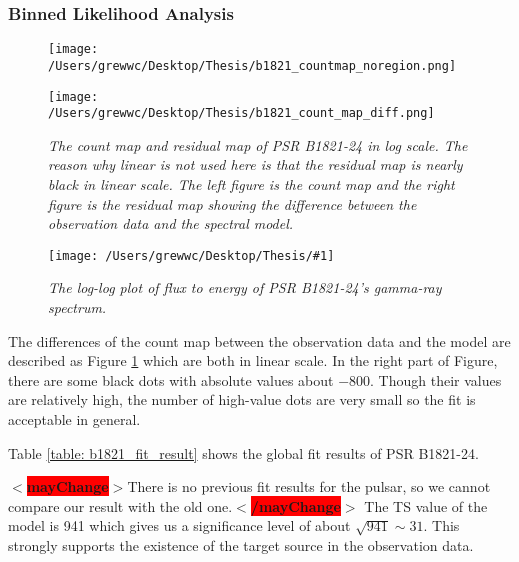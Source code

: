 \documentclass[12pt]{report}
\newcommand{\mycaption}[1]{\caption{\textit{\footnotesize #1}}}
\newcommand{\singleFig}[3]{
 \begin{figure}[!ht]
  \centering
  \texttt{[image: /Users/grewwc/Desktop/Thesis/\#1]}
  \mycaption{#3}
 \label{fig: #1}
 \end{figure}
}
\newcommand{\mayChange}[1]{
  $<$\colorbox{red}{\textbf{mayChange}}$>$#1$<$\colorbox{red}{\textbf{/mayChange}}$>$
}
\begin{document}
              \subsubsection{Binned Likelihood Analysis}
              \begin{figure}[!ht]
                \begin{center}
                \begin{minipage}{0.45\textwidth}
                  \begin{center} 
                    \texttt{[image: /Users/grewwc/Desktop/Thesis/b1821\_countmap\_noregion.png]}
                  \end{center}
                \end{minipage}
                \begin{minipage}{0.45\textwidth}
                  \begin{center}
                    \texttt{[image: /Users/grewwc/Desktop/Thesis/b1821\_count\_map\_diff.png]}
                  \end{center}
                \end{minipage}
              \end{center}
              \mycaption{The count map and residual map of PSR B1821-24 in log scale. 
              The reason why linear is not used here is that the residual map is nearly black in linear scale.
              The \textsf{left} figure is the count map and the \textsf{right} 
              figure is the residual map showing the difference between the observation data and the spectral model.}
              \label{fig: b1821_count_map_diff.png}
            \end{figure}

            \singleFig{b1821_cur.png}{0.40}{The log-log plot of flux to energy of 
              PSR B1821-24's gamma-ray spectrum.}
              \vspace{1cm}

            The differences of the count map between the observation data and the model are described as Figure
            \ref{fig: b1821_count_map_diff.png} which are both in linear scale. In the right part of Figure, 
            there are some black dots 
            with absolute values about $-800$. Though their values are relatively high, the number of 
            high-value dots are very small so the fit is acceptable in general. 

            Table \ref{table: b1821_fit_result} shows the global fit results of PSR B1821-24. 
            \mayChange{There is no previous fit results for the pulsar, so we cannot compare our result
            with the old one.} The TS value of the model is 941 which gives us a significance level 
            of about $\sqrt{941} \sim 31$. This strongly supports the existence of the target source in 
            the observation data.
\end{document}
